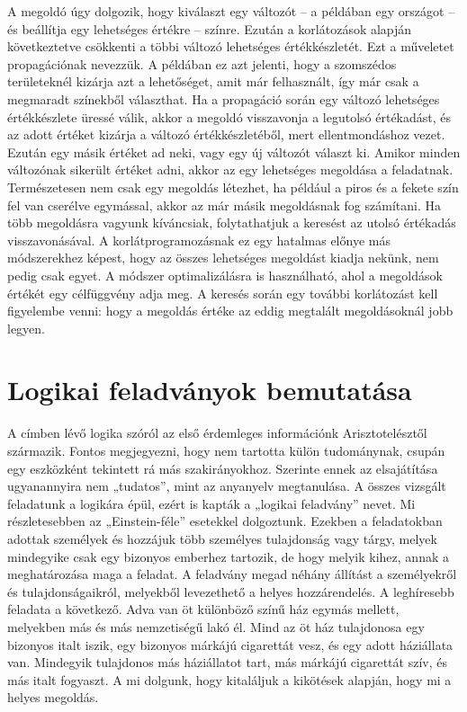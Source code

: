 \documentclass[12pt,a4paper,twoside, openright]{report}
\begin{document}
    A megoldó úgy dolgozik, hogy kiválaszt egy változót – a példában egy országot – és beállítja egy lehetséges értékre – színre.
    Ezután a korlátozások alapján következtetve csökkenti a többi változó lehetséges értékkészletét.
    Ezt a műveletet propagációnak nevezzük.
    A példában ez azt jelenti, hogy a szomszédos területeknél kizárja azt a lehetőséget, amit már felhasznált, így már csak a megmaradt színekből választhat.
    Ha a propagáció során egy változó lehetséges értékkészlete üressé válik, akkor a megoldó visszavonja a legutolsó értékadást, és az adott értéket kizárja a változó értékkészletéből, mert ellentmondáshoz vezet.
    Ezután egy másik értéket ad neki, vagy egy új változót választ ki.
    Amikor minden változónak sikerült értéket adni, akkor az egy lehetséges megoldása a feladatnak.
    Természetesen nem csak egy megoldás létezhet, ha például a piros és a fekete szín fel van cserélve egymással, akkor az már másik megoldásnak fog számítani.
    Ha több megoldásra vagyunk kíváncsiak, folytathatjuk a keresést az utolsó értékadás visszavonásával.
    A korlátprogramozásnak ez egy hatalmas előnye más módszerekhez képest, hogy az összes lehetséges megoldást kiadja nekünk, nem pedig csak egyet.
    A módszer optimalizálásra is használható, ahol a megoldások értékét egy célfüggvény adja meg.
    A keresés során egy további korlátozást kell figyelembe venni: hogy a megoldás értéke az eddig megtalált megoldásoknál jobb legyen.


\section{Logikai feladványok bemutatása}

    A címben lévő logika szóról az első érdemleges információnk Arisztotelésztől származik.
    Fontos megjegyezni, hogy nem tartotta külön tudománynak, csupán egy eszközként tekintett rá más szakirányokhoz.
    Szerinte ennek az elsajátítása ugyanannyira nem „tudatos”, mint az anyanyelv megtanulása.\cite{logic}
    A összes vizsgált feladatunk a logikára épül, ezért is kapták a „logikai feladvány” nevet.
    Mi részletesebben az „Einstein-féle” esetekkel\cite{logicpuzzles} dolgoztunk.
    Ezekben a feladatokban adottak személyek és hozzájuk több személyes tulajdonság vagy tárgy, melyek mindegyike csak egy bizonyos emberhez tartozik, de hogy melyik kihez, annak a meghatározása maga a feladat.
    A feladvány megad néhány állítást a személyekről és tulajdonságaikról, melyekből levezethető a helyes hozzárendelés.
    A leghíresebb feladata a következő.
    Adva van öt különböző színű ház egymás mellett, melyekben más és más nemzetiségű lakó él.
    Mind az öt ház tulajdonosa egy bizonyos italt iszik, egy bizonyos márkájú cigarettát vesz, és egy adott háziállata van.
    Mindegyik tulajdonos más háziállatot tart, más márkájú cigarettát szív, és más italt fogyaszt.
    A mi dolgunk, hogy kitaláljuk a kikötések alapján, hogy mi a helyes megoldás.
\end{document}
